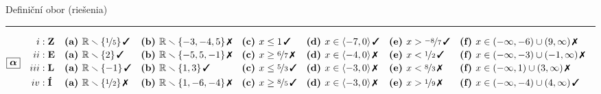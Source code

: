 \documentclass[10pt]{report}
\begin{document}
\begin{landscape}
\begin{center}
{\huge Definiční obor (riešenia)}\\[4mm]
\begin{varwidth}{\linewidth}
\begin{center}
\small
\rule[1mm]{\linewidth}{0.5pt}
$\boxed{\bm{\alpha}} \quad \begin{aligned}
\romannumeral1 : \; &\textbf{Z} 
 &&\mathrm{\textbf{(a) }} \mathbb{R}\smallsetminus\{\nicefrac{1}{5}\}\,\text{\ding{51}}
 &&\mathrm{\textbf{(b) }} \mathbb{R}\smallsetminus\{-3,-4,5\}\,\text{\ding{55}}
 &&\mathrm{\textbf{(c) }} x\leq1\,\text{\ding{51}}
 &&\mathrm{\textbf{(d) }} x\in\langle-7 , 0\rangle\,\text{\ding{51}}
 &&\mathrm{\textbf{(e) }} x>\nicefrac{-8}{7}\,\text{\ding{51}}
 &&\mathrm{\textbf{(f) }} x\in(-\infty , -6)\cup(9 , \infty)\,\text{\ding{55}}
\\[-0.4mm]
\romannumeral2 : \; &\textbf{E} 
 &&\mathrm{\textbf{(a) }} \mathbb{R}\smallsetminus\{2\}\,\text{\ding{51}}
 &&\mathrm{\textbf{(b) }} \mathbb{R}\smallsetminus\{-5,5,-1\}\,\text{\ding{55}}
 &&\mathrm{\textbf{(c) }} x\geq\nicefrac{6}{7}\,\text{\ding{55}}
 &&\mathrm{\textbf{(d) }} x\in\langle-4 , 0\rangle\,\text{\ding{55}}
 &&\mathrm{\textbf{(e) }} x<\nicefrac{1}{2}\,\text{\ding{51}}
 &&\mathrm{\textbf{(f) }} x\in(-\infty , -3)\cup(-1 , \infty)\,\text{\ding{55}}
\\[-0.4mm]
\romannumeral3 : \; &\textbf{L} 
 &&\mathrm{\textbf{(a) }} \mathbb{R}\smallsetminus\{-1\}\,\text{\ding{51}}
 &&\mathrm{\textbf{(b) }} \mathbb{R}\smallsetminus\{1,3\}\,\text{\ding{51}}
 &&\mathrm{\textbf{(c) }} x\leq\nicefrac{5}{3}\,\text{\ding{51}}
 &&\mathrm{\textbf{(d) }} x\in\langle-3 , 0\rangle\,\text{\ding{55}}
 &&\mathrm{\textbf{(e) }} x<\nicefrac{8}{3}\,\text{\ding{55}}
 &&\mathrm{\textbf{(f) }} x\in(-\infty , 1)\cup(3 , \infty)\,\text{\ding{55}}
\\[-0.4mm]
\romannumeral4 : \; &\textbf{Í} 
 &&\mathrm{\textbf{(a) }} \mathbb{R}\smallsetminus\{\nicefrac{1}{2}\}\,\text{\ding{55}}
 &&\mathrm{\textbf{(b) }} \mathbb{R}\smallsetminus\{1,-6,-4\}\,\text{\ding{55}}
 &&\mathrm{\textbf{(c) }} x\geq\nicefrac{8}{5}\,\text{\ding{51}}
 &&\mathrm{\textbf{(d) }} x\in\langle-3 , 0\rangle\,\text{\ding{55}}
 &&\mathrm{\textbf{(e) }} x>\nicefrac{1}{9}\,\text{\ding{55}}
 &&\mathrm{\textbf{(f) }} x\in(-\infty , -4)\cup(4 , \infty)\,\text{\ding{51}}
\end{aligned} $
\\[2mm]

\end{center}
\end{varwidth}
\end{center}
\end{landscape}
\end{document}
